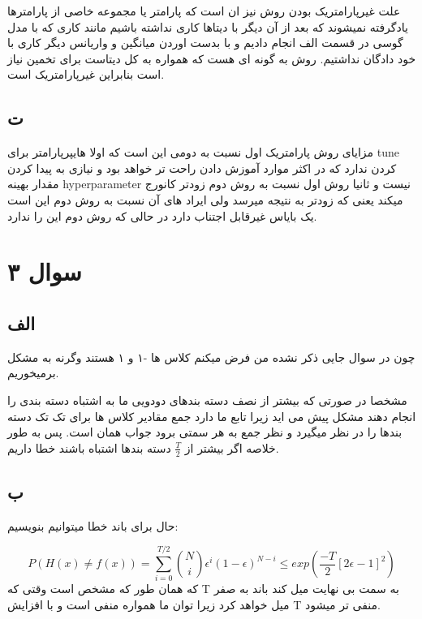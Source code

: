 \documentclass{article}[12pt]
\begin{document}
علت غیرپارامتریک بودن روش نیز ان است که پارامتر یا مجموعه خاصی از پارامترها یادگرفته نمیشوند که بعد از آن دیگر با دیتاها کاری نداشته باشیم مانند کاری که با مدل گوسی در قسمت الف انجام دادیم و با بدست اوردن میانگین و واریانس دیگر کاری با خود دادگان نداشتیم.  
روش به گونه ای هست که همواره به کل دیتاست برای تخمین نیاز است بنابراین غیرپارامتریک است. 

\clearpage
\subsection{ت}
مزایای روش پارامتریک اول نسبت به دومی این است که اولا 
هایپرپارامتر برای tune کردن ندارد که در اکثر موارد آموزش دادن راحت تر خواهد بود و نیازی به پیدا کردن مقدار بهینه hyperparameter نیست و ثانیا روش اول نسبت به روش دوم زودتر کانورج میکند یعنی که زودتر به نتیجه میرسد 
ولی ایراد های آن نسبت به روش دوم این است  
یک بایاس غیرقابل اجتناب دارد در حالی که روش دوم این را ندارد. 
\clearpage
\section{سوال ۳}
\subsection{الف}

 چون در سوال جایی ذکر نشده من فرض میکنم کلاس ها -۱ و ۱ هستند وگرنه به مشکل برمیخوریم. 


مشخصا در صورتی که بیشتر از نصف دسته بندهای دودویی ما به اشتباه دسته بندی را انجام دهند مشکل پیش می اید زیرا تابع ما دارد جمع مقادیر کلاس ها برای تک تک دسته بندها را در نظر میگیرد و نظر جمع به هر سمتی برود جواب همان است. پس به طور خلاصه اگر بیشتر از 
$\frac{T}{2}$
دسته بندها اشتباه باشند خطا داریم. 
 \subsection{ب}
حال برای باند خطا میتوانیم بنویسیم: 

\begin{equation*}
P(H(x)\neq f(x)) = \sum_{i=0}^{T/2} {N\choose i}
\epsilon^i (1-\epsilon)^{N-i} \leq exp(\frac{-T}{2} 
[2\epsilon-1]^2 ) 
\end{equation*}
که همان طور که مشخص است وقتی که T به سمت بی نهایت میل کند باند به صفر میل خواهد کرد زیرا توان ما همواره منفی است و با افزایش T منفی تر میشود. 
\end{document}
